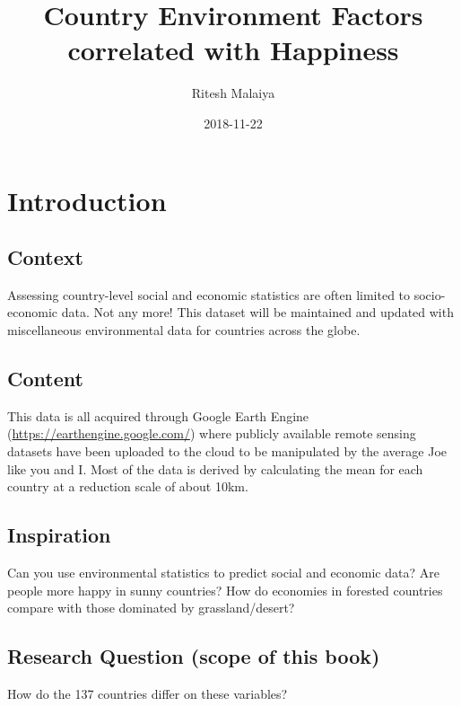 \documentclass[]{book}
\title{Country Environment Factors correlated with Happiness}
\author{Ritesh Malaiya}
\date{2018-11-22}
\begin{document}
\maketitle

{
\setcounter{tocdepth}{1}
\tableofcontents
}
\hypertarget{intro}{%
\chapter{Introduction}\label{intro}}

\hypertarget{context}{%
\section{Context}\label{context}}

Assessing country-level social and economic statistics are often limited
to socio-economic data. Not any more! This dataset will be maintained
and updated with miscellaneous environmental data for countries across
the globe.

\hypertarget{content}{%
\section{Content}\label{content}}

This data is all acquired through Google Earth Engine
(\url{https://earthengine.google.com/}) where publicly available remote
sensing datasets have been uploaded to the cloud to be manipulated by
the average Joe like you and I. Most of the data is derived by
calculating the mean for each country at a reduction scale of about
10km.

\hypertarget{inspiration}{%
\section{Inspiration}\label{inspiration}}

Can you use environmental statistics to predict social and economic
data? Are people more happy in sunny countries? How do economies in
forested countries compare with those dominated by grassland/desert?

\hypertarget{research-question-scope-of-this-book}{%
\section{Research Question (scope of this
book)}\label{research-question-scope-of-this-book}}

How do the 137 countries differ on these variables?
\end{document}
